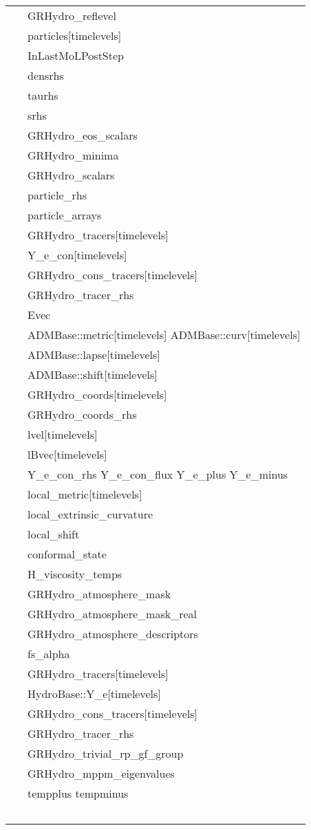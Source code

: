 \documentclass{article}
\begin{document}
\begin{tabular*}{160mm}{ll}
~ &  GRHydro\_reflevel\\ 
~ &  particles[timelevels]\\ 
~ &  InLastMoLPostStep\\ 
~ &  densrhs\\ 
~ &  taurhs\\ 
~ &  srhs\\ 
~ &  GRHydro\_eos\_scalars\\ 
~ &  GRHydro\_minima\\ 
~ &  GRHydro\_scalars\\ 
~ &  particle\_rhs\\ 
~ &  particle\_arrays\\ 
~ &  GRHydro\_tracers[timelevels]\\ 
~ &  Y\_e\_con[timelevels]\\ 
~ &  GRHydro\_cons\_tracers[timelevels]\\ 
~ &  GRHydro\_tracer\_rhs\\ 
~ &  Evec\\ 
~ &  ADMBase::metric[timelevels] ADMBase::curv[timelevels]\\ 
~ &  ADMBase::lapse[timelevels]\\ 
~ &  ADMBase::shift[timelevels]\\ 
~ &  GRHydro\_coords[timelevels]\\ 
~ &  GRHydro\_coords\_rhs\\ 
~ &  lvel[timelevels]\\ 
~ &  lBvec[timelevels]\\ 
~ &  Y\_e\_con\_rhs Y\_e\_con\_flux Y\_e\_plus Y\_e\_minus\\ 
~ &  local\_metric[timelevels]\\ 
~ &  local\_extrinsic\_curvature\\ 
~ &  local\_shift\\ 
~ &  conformal\_state\\ 
~ &  H\_viscosity\_temps\\ 
~ &  GRHydro\_atmosphere\_mask\\ 
~ &  GRHydro\_atmosphere\_mask\_real\\ 
~ &  GRHydro\_atmosphere\_descriptors\\ 
~ &  fs\_alpha\\ 
~ &  GRHydro\_tracers[timelevels]\\ 
~ &  HydroBase::Y\_e[timelevels]\\ 
~ &  GRHydro\_cons\_tracers[timelevels]\\ 
~ &  GRHydro\_tracer\_rhs\\ 
~ &  GRHydro\_trivial\_rp\_gf\_group\\ 
~ &  GRHydro\_mppm\_eigenvalues\\ 
~ &  tempplus tempminus\\ 
~ & ~\\ 
\end{tabular*} 
\end{document}
